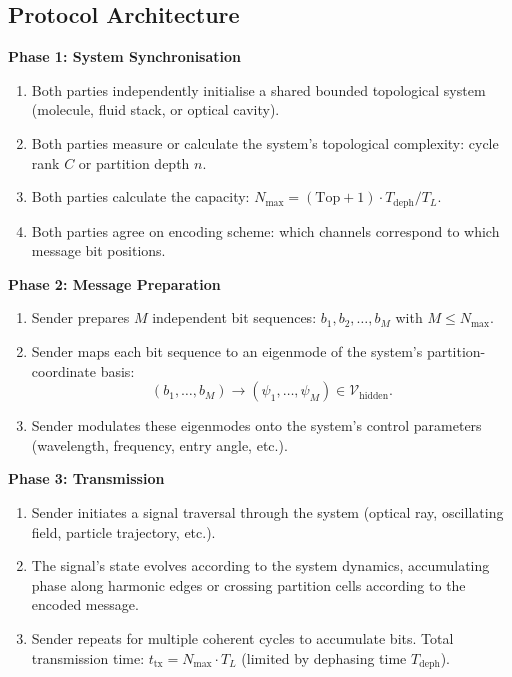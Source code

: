 \documentclass[11pt,twocolumn,a4paper]{article}
\theoremstyle{definition}
\begin{document}
\subsection{Protocol Architecture}

\begin{protocol}
\label{prot:unified}

\textbf{Phase 1: System Synchronisation}

\begin{enumerate}[nosep,label=1.\arabic*]
\item Both parties independently initialise a shared bounded topological system (molecule, fluid stack, or optical cavity).
\item Both parties measure or calculate the system's topological complexity: cycle rank $C$ or partition depth $n$.
\item Both parties calculate the capacity: $N_{\max} = (\text{Top} + 1) \cdot T_{\text{deph}}/T_L$.
\item Both parties agree on encoding scheme: which channels correspond to which message bit positions.
\end{enumerate}

\textbf{Phase 2: Message Preparation}

\begin{enumerate}[nosep,label=2.\arabic*]
\item Sender prepares $M$ independent bit sequences: $b_1, b_2, \ldots, b_M$ with $M \leq N_{\max}$.
\item Sender maps each bit sequence to an eigenmode of the system's partition-coordinate basis:
\[
(b_1, \ldots, b_M) \rightarrow (\psi_1, \ldots, \psi_M) \in \mathcal{V}_{\text{hidden}}.
\]
\item Sender modulates these eigenmodes onto the system's control parameters (wavelength, frequency, entry angle, etc.).
\end{enumerate}

\textbf{Phase 3: Transmission}

\begin{enumerate}[nosep,label=3.\arabic*]
\item Sender initiates a signal traversal through the system (optical ray, oscillating field, particle trajectory, etc.).
\item The signal's state evolves according to the system dynamics, accumulating phase along harmonic edges or crossing partition cells according to the encoded message.
\item Sender repeats for multiple coherent cycles to accumulate bits. Total transmission time: $t_{\text{tx}} = N_{\max} \cdot T_L$ (limited by dephasing time $T_{\text{deph}}$).
\end{enumerate}


\end{protocol}
\end{document}
